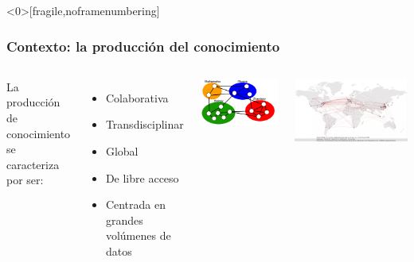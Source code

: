 \begin{frame}<0>[fragile,noframenumbering]
\frametitle{Contexto: la producción del conocimiento}
\begin{columns}[c] %

La producción de conocimiento se caracteriza por ser: 
\begin{itemize}
\item Colaborativa
\item Transdisciplinar
\item Global
\item De libre acceso
\item Centrada en grandes volúmenes de datos
\end{itemize}


\begin{center}
\includegraphics[scale=0.18]{imagenes/Network-of-Scientists3.png}
\end{center}

\begin{center}
\includegraphics[scale=0.18]{imagenes/covid19_collab.png}
\end{center}
\end{columns}
\vspace{0.25cm}


\end{frame}
